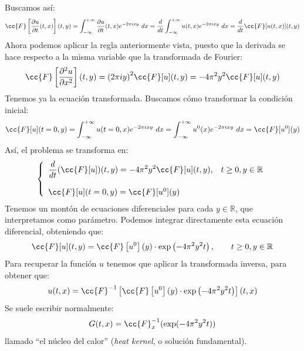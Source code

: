 \noindent
Buscamos así:
\begin{equation*}
    \cc{F}\left[\frac{\partial u}{\partial t}(t,x)\right](t,y) = \int_{-\infty}^{+\infty} \frac{\partial u}{\partial t}(t,x)e^{-2\pi ixy}~dx  = \frac{d}{dt}\int_{-\infty}^{+\infty} u(t,x)e^{-2\pi ixy}~dx  = \frac{d}{dt}\cc{F}[u(t,x)](t,y)
\end{equation*}
Ahora podemos aplicar la regla anteriormente vista, puesto que la derivada se hace respecto a la misma variable que la transformada de Fourier:
\begin{equation*}
    \cc{F}\left[\frac{\partial^2 u}{\partial x^2}\right](t,y) = {(2\pi iy)}^{2}\cc{F}[u](t,y) = -4\pi^2 y^2 \cc{F}[u](t,y)
\end{equation*}
Tenemos ya la ecuación transformada. Buscamos cómo transformar la condición inicial:
\begin{equation*}
    \cc{F}[u](t=0,y) = \int_{-\infty}^{+\infty} u(t=0,x)e^{-2\pi ixy}~dx = \int_{-\infty}^{+\infty} u^0(x)e^{-2\pi ixy}~dx = \cc{F}[u^0](y)
\end{equation*}
Así, el problema se transforma en:
\begin{equation*}
    \left\{\begin{array}{ll}
            \displaystyle \frac{d}{dt}(\cc{F}[u])(t,y) = -4\pi^2 y^2 \cc{F}[u](t,y), & t\geq 0, y\in \mathbb{R} \\
            \\
            \cc{F}[u](t=0,y) = \cc{F}[u^0](y)
    \end{array}\right.
\end{equation*}
Tenemos un montón de ecuaciones diferenciales para cada $y\in \mathbb{R}$, que interpretamos como parámetro. Podemos integrar directamente esta ecuación diferencial, obteniendo que:
\begin{equation*}
    \cc{F}[u](t,y) = \cc{F}\left[u^0\right](y) \cdot \exp\left(-4\pi^2y^2 t\right), \qquad t\geq0, y\in \mathbb{R}
\end{equation*}
Para recuperar la función $u$ tenemos que aplicar la transformada inversa, para obtener que:
\begin{equation}\label{eq:form_calor}
    u(t,x) = \cc{F}^{-1}\left[\cc{F}\left[u^0\right](y) \cdot \exp\left(-4\pi^2y^2 t\right)\right](t,x)
\end{equation}
Se suele escribir normalmente:
\begin{equation*}
    G(t,x) = \cc{F}^{-1}_x(\exp(-4\pi^2y^2 t))
\end{equation*}
llamado ``el núcleo del calor'' (\textit{heat kernel}, o solución fundamental).\\

